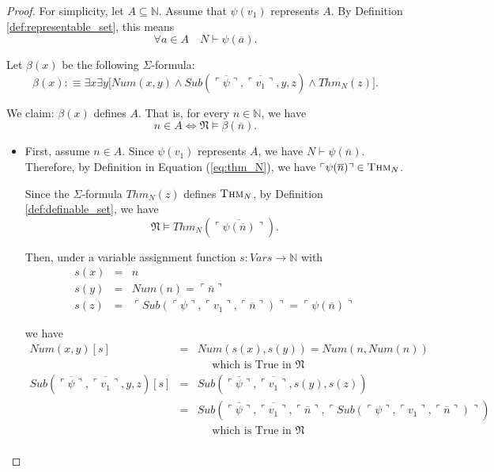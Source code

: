 \documentclass[11pt,letterpaper]{book}
\theoremstyle{definition}
\begin{document}
\begin{proof}
For simplicity, let $A \subseteq \mathbb{N}$. Assume that $\psi (v_1)$ represents $A$. By Definition \ref{def:representable_set}, this means 
$$ \forall a \in A \quad N \vdash \psi(\overline{a}) .$$

Let $\beta (x)$ be the following $\Sigma$-formula:
\begin{equation}
\beta(x) :\equiv \exists x \exists y \big[ Num(x, y) \land Sub( \overline{\ulcorner \psi \urcorner}, \overline{\ulcorner v_1 \urcorner}, y, z ) \land Thm_N (z) \big] . \nonumber
\end{equation}

We claim: $\beta(x)$ defines $A$. That is, for every $n \in \mathbb{N}$, we have
$$ n \in A \iff \mathfrak{N} \models \beta (\overline{n}) .$$

\begin{itemize}
\item{First, assume $n \in A$. Since $\psi (v_1)$ represents $A$, we have $N \vdash \psi (\overline{n})$. Therefore, by Definition in Equation (\ref{eq:thm_N}), we have $\ulcorner \psi (\overline{n}) \urcorner \in \text{\textsc{Thm}}_N $.

Since the $\Sigma$-formula $Thm_N (z)$ defines $\text{\textsc{Thm}}_N$, by Definition \ref{def:definable_set}, we have 
$$\mathfrak{N} \models Thm_N ( \overline{\ulcorner \psi ( \overline{n} ) \urcorner} ) . $$

Then, under a variable assignment function $s: Vars \rightarrow \mathbb{N}$ with
\begin{eqnarray*}
s(x) & = & n \\
s(y) & = & Num(n) = \ulcorner \overline{n} \urcorner \\
s(z) & = & \ulcorner Sub( \ulcorner \psi \urcorner, \ulcorner v_1 \urcorner, \ulcorner \overline{n} \urcorner  ) \urcorner = \ulcorner \psi ( \overline{n} ) \urcorner 
\end{eqnarray*}

we have
\begin{eqnarray*}
Num(x, y)[s] &=& Num(s(x), s(y)) = Num(n, Num(n) ) \\
& & \quad \text{ which is True in } \mathfrak{N} \\
Sub( \overline{\ulcorner \psi \urcorner}, \overline{\ulcorner v_1 \urcorner}, y, z )[s] &=& Sub( \overline{\ulcorner \psi \urcorner}, \overline{\ulcorner v_1 \urcorner}, s(y), s(z) ) \\
& =& Sub( \overline{\ulcorner \psi \urcorner}, \overline{\ulcorner v_1 \urcorner},\ulcorner \overline{n} \urcorner , \ulcorner  Sub( \ulcorner \psi \urcorner, \ulcorner v_1 \urcorner, \ulcorner \overline{n} \urcorner  ) \urcorner ) \\
& & \quad \text{ which is True in } \mathfrak{N} \\
\end{eqnarray*}

}
\end{itemize}
\end{proof}
\end{document}
